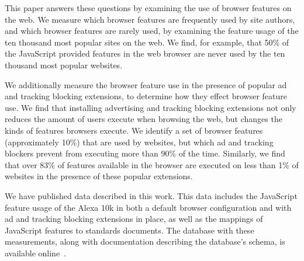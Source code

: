 This paper answers these questions by examining the use of browser features on
the web.  We measure which browser features are frequently used by site authors,
and which browser features are rarely used, by examining the \JS feature
usage of the ten thousand most popular sites on the web.  We find, for example, that
50\% of the JavaScript provided features in the web browser are never
used by the ten thousand most popular websites.

We additionally measure the browser feature use in the presence of popular ad and
tracking blocking extensions, to determine how they effect browser feature use.
We find that installing
advertising and tracking blocking extensions not only reduces
the amount of \JS users execute when browsing the web, but changes the kinds of
features browsers execute. We identify a set of browser
features (approximately 10\%) that are used by websites, but which ad and
tracking blockers prevent from executing more than 90\% of the time.
Similarly, we find that over 83\% of features available in the browser are
executed on less than 1\% of websites in the presence of these popular extensions.

We have published data described in this work.  This data includes the JavaScript
feature usage of the Alexa 10k in both a default browser configuration and with ad
and tracking blocking extensions in place, as well as the mappings of JavaScript
features to standards documents.  The database with these measurements, along
with documentation describing the database's schema, is available
online~\cite{snyderp2016webapidata}.
